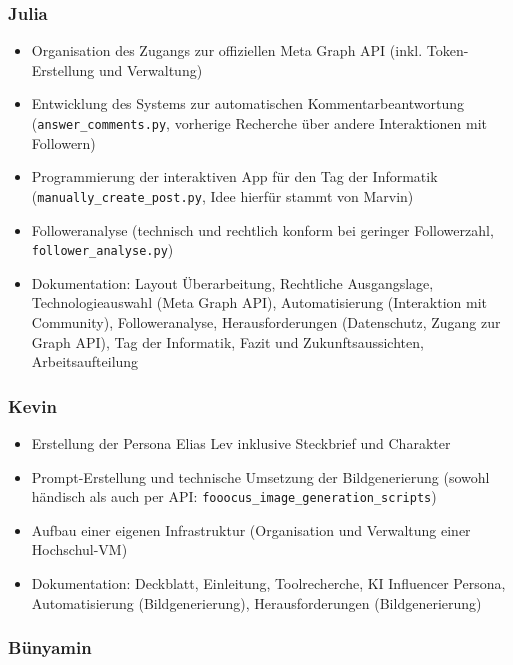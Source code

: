 \documentclass[a4paper,12pt]{article}
\begin{document}
\subsubsection*{Julia}

\begin{itemize}
    \item Organisation des Zugangs zur offiziellen Meta Graph API (inkl. Token-Erstellung und Verwaltung)
    \item Entwicklung des Systems zur automatischen Kommentarbeantwortung (\texttt{answer\_comments.py}, vorherige Recherche über andere Interaktionen mit Followern)
    \item Programmierung der interaktiven App für den Tag der Informatik (\texttt{manually\_create\_post.py}, Idee hierfür stammt von Marvin)
    \item Followeranalyse (technisch und rechtlich konform bei geringer Followerzahl, \texttt{follower\_analyse.py})
    \item Dokumentation: Layout Überarbeitung, Rechtliche Ausgangslage, Technologieauswahl (Meta Graph API), Automatisierung (Interaktion mit Community), Followeranalyse, Herausforderungen (Datenschutz, Zugang zur Graph API), Tag der Informatik, Fazit und Zukunftsaussichten, Arbeitsaufteilung
\end{itemize}

\subsubsection*{Kevin}

\begin{itemize}
    \item Erstellung der Persona Elias Lev inklusive Steckbrief und Charakter
    \item Prompt-Erstellung und technische Umsetzung der Bildgenerierung (sowohl händisch als auch per API: \texttt{fooocus\_image\_generation\_scripts})
    \item Aufbau einer eigenen Infrastruktur (Organisation und Verwaltung einer Hochschul-VM)
    \item Dokumentation: Deckblatt, Einleitung, Toolrecherche, KI Influencer Persona, Automatisierung (Bildgenerierung), Herausforderungen (Bildgenerierung)
\end{itemize}

\subsubsection*{Bünyamin}
\end{document}
